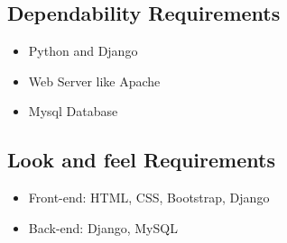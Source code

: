 \subsection{Dependability Requirements}
\begin{itemize}
	\item Python and Django 
	\item Web Server like Apache
	\item Mysql Database

\end{itemize}

\subsection{Look and feel Requirements}
\begin{itemize}
	\item Front-end: HTML, CSS, Bootstrap, Django
	\item Back-end: Django, MySQL
	\end{itemize}


